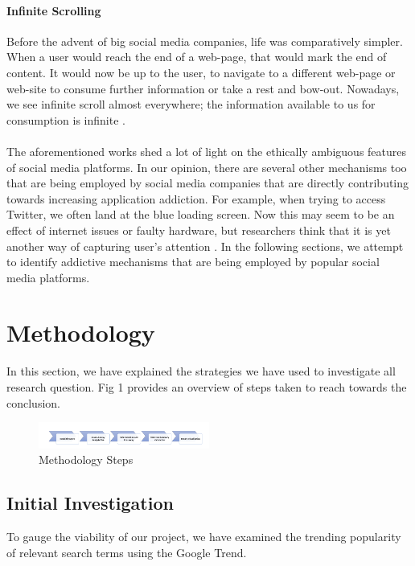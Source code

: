 \documentclass[conference]{IEEEtran}
\begin{document}
\paragraph{Infinite Scrolling} Before the advent of big social media companies, life was comparatively simpler. When a user would reach the end of a web-page, that would mark the end of content. It would now be up to the user, to navigate to a different web-page or web-site to consume further information or take a rest and bow-out. Nowadays, we see infinite scroll almost everywhere; the information available to us for consumption is infinite \cite{williams2018, harris2019}.\\\\
The aforementioned works shed a lot of light on the ethically ambiguous features of social media platforms. In our opinion, there are several other mechanisms too that are being employed by social media companies that are directly contributing towards increasing application addiction. For example, when trying to access Twitter, we often land at the blue loading screen. Now this may seem to be an effect of internet issues or faulty hardware, but researchers think that it is yet another way of capturing user's attention \cite{morgan2017}. In the following sections, we attempt to identify addictive mechanisms that are being employed by popular social media platforms.

\section{Methodology}
In this section, we have explained the strategies we have used to investigate all research question. Fig 1 provides an overview of
steps taken to reach towards the conclusion. 

\begin{figure}[htbp]
\centerline{\includegraphics[width=0.5\textwidth]{Capture1.PNG}}
\caption{Methodology Steps}
\label{fig}
\end{figure}


\subsection{Initial Investigation}

To gauge the viability of our project, we have examined the trending popularity of relevant search terms using the Google Trend.
\end{document}

